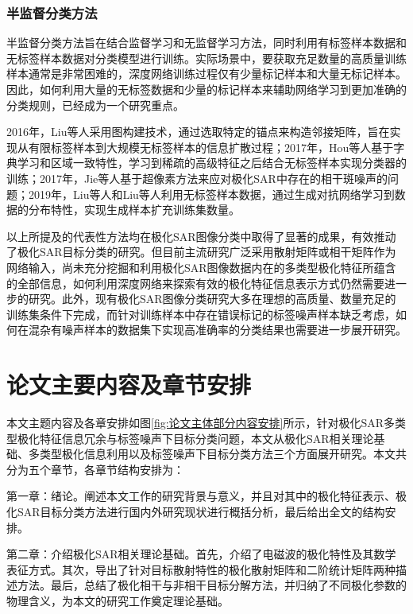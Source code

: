 \subsubsection{半监督分类方法}
半监督分类方法旨在结合监督学习和无监督学习方法，同时利用有标签样本数据和无标签样本数据对分类模型进行训练。实际场景中，要获取充足数量的高质量训练样本通常是非常困难的，深度网络训练过程仅有少量标记样本和大量无标记样本。因此，如何利用大量的无标签数据和少量的标记样本来辅助网络学习到更加准确的分类规则，已经成为一个研究重点。

2016年，Liu等人采用图构建技术，通过选取特定的锚点来构造邻接矩阵，旨在实现从有限标签样本到大规模无标签样本的信息扩散过程；2017年，Hou等人基于字典学习和区域一致特性，学习到稀疏的高级特征之后结合无标签样本实现分类器的训练；2017年，Jie等人基于超像素方法来应对极化SAR中存在的相干斑噪声的问题；2019年，Liu等人和Liu等人利用无标签样本数据，通过生成对抗网络学习到数据的分布特性，实现生成样本扩充训练集数量。


以上所提及的代表性方法均在极化SAR图像分类中取得了显著的成果，有效推动了极化SAR目标分类的研究。但目前主流研究广泛采用散射矩阵或相干矩阵作为网络输入，尚未充分挖掘和利用极化SAR图像数据内在的多类型极化特征所蕴含的全部信息，如何利用深度网络来探索有效的极化特征信息表示方式仍然需要进一步的研究。此外，现有极化SAR图像分类研究大多在理想的高质量、数量充足的训练集条件下完成，而针对训练样本中存在错误标记的标签噪声样本缺乏考虑，如何在混杂有噪声样本的数据集下实现高准确率的分类结果也需要进一步展开研究。

\section{论文主要内容及章节安排}
本文主题内容及各章安排如图\ref{fig:论文主体部分内容安排}所示，针对极化SAR多类型极化特征信息冗余与标签噪声下目标分类问题，本文从极化SAR相关理论基础、多类型极化信息利用以及标签噪声下目标分类方法三个方面展开研究。本文共分为五个章节，各章节结构安排为：

第一章：绪论。阐述本文工作的研究背景与意义，并且对其中的极化特征表示、极化SAR目标分类方法进行国内外研究现状进行概括分析，最后给出全文的结构安排。

第二章：介绍极化SAR相关理论基础。首先，介绍了电磁波的极化特性及其数学表征方式。其次，导出了针对目标散射特性的极化散射矩阵和二阶统计矩阵两种描述方法。最后，总结了极化相干与非相干目标分解方法，并归纳了不同极化参数的物理含义，为本文的研究工作奠定理论基础。

